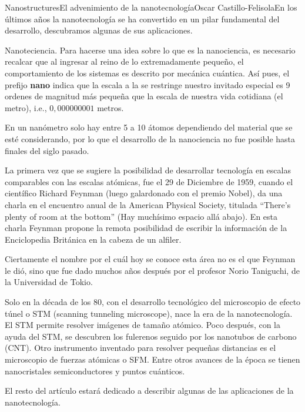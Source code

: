 \begin{article}{Nanostructures}{El advenimiento de la nanotecnolog\'ia}{Oscar Castillo-Felisola}{En los \'ultimos a\~nos la nanotecnolog\'ia se ha convertido en un pilar fundamental del desarrollo, descubramos algunas de sus aplicaciones.}

Nanoteciencia. Para hacerse una idea sobre lo que es la nanociencia, es necesario recalcar que al ingresar al reino de lo extremadamente peque\~no, el comportamiento de los sistemas es descrito por mec\'anica cu\'antica. As\'i pues, el prefijo {\bf nano} indica que la escala a la se restringe nuestro invitado especial es 9 ordenes de magnitud m\'as peque\~na que la escala de nuestra vida cotidiana (el metro), i.e., $0,000000001$ metros.


En un nan\'ometro solo hay entre 5 a 10 \'atomos dependiendo del material  que se est\'e considerando, por lo que el desarrollo de la nanociencia no fue posible hasta finales del siglo pasado.




La primera vez que se sugiere la posibilidad de desarrollar tecnolog\'ia en escalas comparables con las escalas at\'omicas, fue el 29 de Diciembre de 1959, cuando  el cient\'ifico Richard Feynman (luego galardonado con el premio Nobel), da una charla  en el encuentro anual de la American Physical  Society, titulada ``There's plenty of room at the bottom'' (Hay much\'isimo espacio all\'a abajo). En esta charla Feynman propone la remota posibilidad de escribir la informaci\'on de la Enciclopedia Brit\'anica en la cabeza de un alfiler.

Ciertamente el nombre por el cu\'al hoy se conoce esta \'area no es el que Feynman le di\'o, sino que fue dado muchos a\~nos despu\'es por el profesor Norio Taniguchi, de la Universidad de Tokio.


Solo en la d\'ecada de los 80, con el desarrollo tecnol\'ogico del microscopio de efecto t\'unel o STM (scanning 
tunneling microscope), nace la era de la nanotecnolog\'ia. El STM permite resolver im\'agenes de tama\~no at\'omico.
Poco despu\'es, con la ayuda del STM, se descubren los fulerenos seguido por los nanotubos de carbono (CNT). Otro instrumento inventado para resolver peque\~nas distancias es el microscopio de fuerzas at\'omicas o SFM. Entre otros avances de la \'epoca se tienen  nanocristales semiconductores y  puntos cu\'anticos.

El resto del art\'iculo estar\'a dedicado a describir algunas de las aplicaciones de la nanotecnolog\'ia.%




\end{article}
